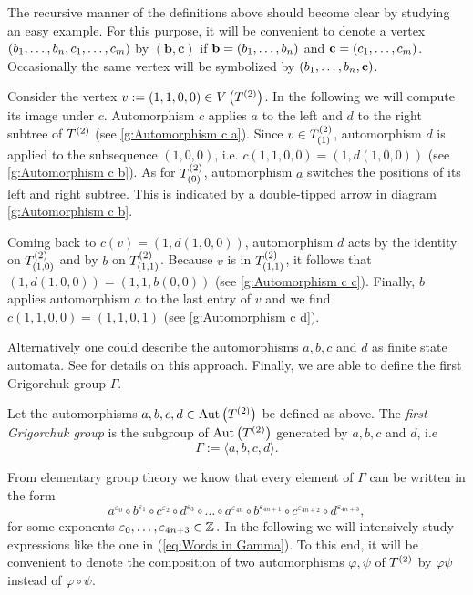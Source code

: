 The recursive manner of the definitions above should become clear by studying an easy example. For this purpose, it will be convenient to denote a vertex $(\seq{b},\seq[m]{c})$ by $(\mathbf{b},\mathbf{c})$ if $\mathbf{b}=(\seq{b})$ and $\mathbf{c}=(\seq[m]{c})$. Occasionally the same vertex will be symbolized by $(\seq{b},\mathbf{c})$.
\begin{exam}
Consider the vertex $v:=(1,1,0,0)\in\VT$. In the following we will compute its image under $c$. Automorphism $c$ applies $a$ to the left and $d$ to the right subtree of $\T$ (see \cref{g:Automorphism c a}). Since $v\in\ST{(1)}$, automorphism $d$ is applied to the subsequence $(1,0,0)$, i.e. $c(1,1,0,0)=(1,d(1,0,0))$ (see \cref{g:Automorphism c b}). As for $\ST{(0)}$, automorphism $a$ switches the positions of its left and right subtree. This is indicated by a double-tipped arrow in diagram \ref{g:Automorphism c b}.

Coming back to $c(v)=(1,d(1,0,0))$, automorphism $d$ acts by the identity on $\ST{(1,0)}$ and by $b$ on $\ST{(1,1)}$. Because $v$ is in $\ST{(1,1)}$, it follows that $(1,d(1,0,0))=(1,1,b(0,0))$ (see \cref{g:Automorphism c c}). Finally, $b$ applies automorphism $a$ to the last entry of $v$ and we find $c(1,1,0,0)=(1,1,0,1)$ (see \cref{g:Automorphism c d}).
\end{exam}

Alternatively one could describe the automorphisms $a,b,c$ and $d$ as finite state automata. See \cite{de2000topics} for details on this approach. Finally, we are able to define the first Grigorchuk group $\Gamma$.
\begin{defin}
Let the automorphisms $a,b,c,d\in\AutT$ be defined as above. The \emph{first Grigorchuk group} is the subgroup of $\AutT$ generated by $a,b,c$ and $d$, i.e
\begin{equation*}
\Gamma:=\langle a,b,c,d\rangle.
\end{equation*}
\end{defin}

From elementary group theory we know that every element of $\Gamma$ can be written in the form
\begin{equation}\label{eq:Words in Gamma}
a^{\varepsilon_0}\circ b^{\varepsilon_1}\circ c^{\varepsilon_2}\circ d^{\varepsilon_3}\circ\ldots\circ a^{\varepsilon_{4n}}\circ b^{\varepsilon_{4n+1}}\circ c^{\varepsilon_{4n+2}}\circ d^{\varepsilon_{4n+3}},
\end{equation}
for some exponents $\varepsilon_0,\ldots,\varepsilon_{4n+3}\in\Z.$ In the following we will intensively study expressions like the one in (\ref{eq:Words in Gamma}). To this end, it will be convenient to denote the composition of two automorphisms $\varphi,\psi$ of $\T$ by $\varphi\psi$ instead of $\varphi\circ\psi.$

